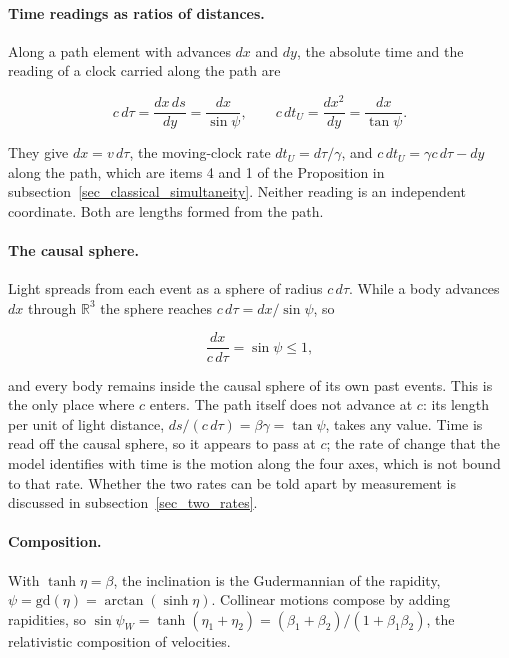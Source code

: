 \documentclass[anonymous]{iopjournal}
\begin{document}
\paragraph{Time readings as ratios of distances.} Along a path element with advances $dx$ and $dy$, the absolute time and the reading of a clock carried along the path are

\begin{equation}\label{eq_path_times}
    c\,d\tau=\frac{dx\,ds}{dy}=\frac{dx}{\sin\psi},
    \qquad
    c\,dt_U=\frac{dx^2}{dy}=\frac{dx}{\tan\psi}.
\end{equation}

They give $dx=v\,d\tau$, the moving-clock rate $dt_U=d\tau/\gamma$, and $c\,dt_U=\gamma c\,d\tau-dy$ along the path, which are items 4 and 1 of the Proposition in subsection~\ref{sec_classical_simultaneity}. Neither reading is an independent coordinate. Both are lengths formed from the path.

\paragraph{The causal sphere.} Light spreads from each event as a sphere of radius $c\,d\tau$. While a body advances $dx$ through $\mathbb{R}^3$ the sphere reaches $c\,d\tau=dx/\sin\psi$, so

\begin{equation}\label{eq_causal_sphere}
    \frac{dx}{c\,d\tau}=\sin\psi\leq1 ,
\end{equation}

and every body remains inside the causal sphere of its own past events. This is the only place where $c$ enters. The path itself does not advance at $c$: its length per unit of light distance, $ds/(c\,d\tau)=\beta\gamma=\tan\psi$, takes any value. Time is read off the causal sphere, so it appears to pass at $c$; the rate of change that the model identifies with time is the motion along the four axes, which is not bound to that rate. Whether the two rates can be told apart by measurement is discussed in subsection~\ref{sec_two_rates}.

\paragraph{Composition.} With $\tanh\eta=\beta$, the inclination is the Gudermannian of the rapidity, $\psi=\mathrm{gd}(\eta)=\arctan(\sinh\eta)$. Collinear motions compose by adding rapidities, so $\sin\psi_W=\tanh(\eta_1+\eta_2)=(\beta_1+\beta_2)/(1+\beta_1\beta_2)$, the relativistic composition of velocities.
\end{document}
